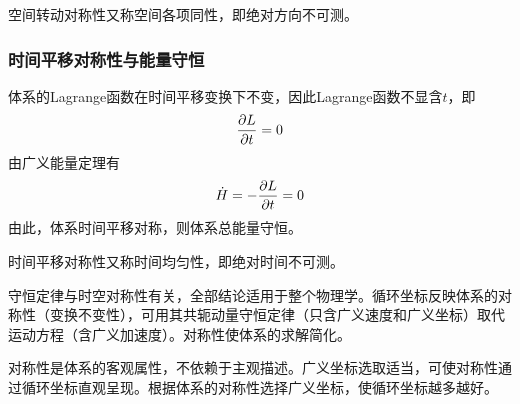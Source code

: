 空间转动对称性又称{\heiti 空间各项同性}，即绝对方向不可测。

\subsubsection{时间平移对称性与能量守恒}

体系的Lagrange函数在时间平移变换下不变，因此Lagrange函数不显含$t$，即
\begin{equation*}
	\frac{\partial L}{\partial t} = 0
\end{equation*}
由广义能量定理有
\begin{equation*}
	\dot{H} = -\frac{\partial L}{\partial t} = 0
\end{equation*}
由此，体系时间平移对称，则体系总能量守恒。

时间平移对称性又称{\heiti 时间均匀性}，即绝对时间不可测。

守恒定律与时空对称性有关，全部结论适用于整个物理学。循环坐标反映体系的对称性（变换不变性），可用其共轭动量守恒定律（只含广义速度和广义坐标）取代运动方程（含广义加速度）。对称性使体系的求解简化。

对称性是体系的客观属性，不依赖于主观描述。广义坐标选取适当，可使对称性通过循环坐标直观呈现。根据体系的对称性选择广义坐标，使循环坐标越多越好。

